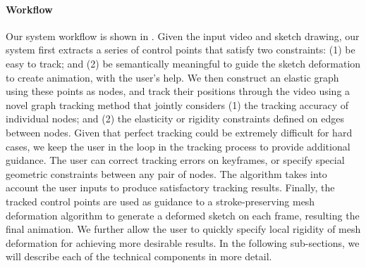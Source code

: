 \paragraph{Workflow}

Our system workflow is shown in . 
Given the input video and sketch drawing, our system first  extracts  a series of control points that satisfy two constraints: (1) be easy to track; and (2) be semantically meaningful to guide the sketch deformation to create animation, with the user's help. We then construct an elastic graph using these points as nodes, and track their positions through the video using a novel graph tracking method that jointly considers (1) the tracking accuracy of individual nodes; and (2) the elasticity or rigidity constraints defined on edges between nodes. Given that perfect tracking could be extremely difficult for hard cases, we keep the user in the loop in the tracking process to provide additional guidance. The user can correct tracking errors on keyframes, or specify special geometric constraints between any pair of nodes. The algorithm takes into account the user inputs to produce satisfactory tracking results. 
Finally, the tracked control points are used as guidance to a stroke-preserving mesh deformation algorithm to generate a deformed sketch on each frame, resulting the final animation. 
We further allow the user to quickly specify local rigidity of mesh deformation for achieving more desirable results. 
In the following sub-sections, we will describe each of the technical components in more detail. 
\fi
%







